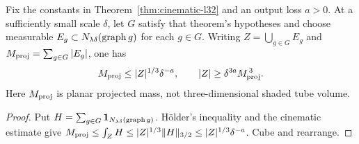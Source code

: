 \begin{lemma}
\label{lem:cinematic-area}
Fix the constants in Theorem~\ref{thm:cinematic-l32} and an output
loss $a>0$. At a sufficiently small scale $\delta$, let $G$ satisfy
that theorem's hypotheses and choose measurable
$E_g\subset N_{\lambda\delta}(\operatorname{graph} g)$ for each $g\in G$.
Writing $Z=\bigcup_{g\in G}E_g$ and
$M_{\rm proj}=\sum_{g\in G}|E_g|$, one has
\[
 M_{\rm proj}\leq |Z|^{1/3}\delta^{-a},\qquad
 |Z|\geq\delta^{3a}M_{\rm proj}^{\,3}.
\]
Here $M_{\rm proj}$ is planar projected mass, not three-dimensional
shaded tube volume.
\end{lemma}
\begin{proof}
Put $H=\sum_{g\in G}\mathbf{1}_{N_{\lambda\delta}(\operatorname{graph} g)}$.
H\"older's inequality and the cinematic estimate give
$M_{\rm proj}\leq\int_Z H\leq |Z|^{1/3}\|H\|_{3/2}
\leq |Z|^{1/3}\delta^{-a}$. Cube and rearrange.
\end{proof}

